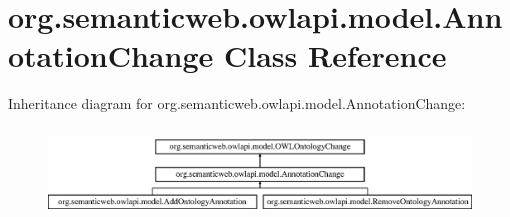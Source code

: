 \hypertarget{classorg_1_1semanticweb_1_1owlapi_1_1model_1_1_annotation_change}{\section{org.\-semanticweb.\-owlapi.\-model.\-Annotation\-Change Class Reference}
\label{classorg_1_1semanticweb_1_1owlapi_1_1model_1_1_annotation_change}
}
Inheritance diagram for org.\-semanticweb.\-owlapi.\-model.\-Annotation\-Change\-:\begin{figure}[H]
\begin{center}
\leavevmode
\includegraphics[height=2.386364cm]{classorg_1_1semanticweb_1_1owlapi_1_1model_1_1_annotation_change}
\end{center}
\end{figure}
